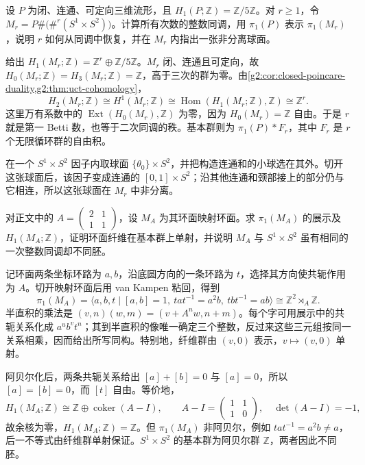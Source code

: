 \begin{exercise}\label{g2:ex:three-connected-sum-homology}
	设 \(P\) 为闭、连通、可定向三维流形，且 \(H_1(P;\mathbb Z)=\mathbb Z/5\mathbb Z\)。对 \(r\ge1\)，令 \(M_r=P\#\bigl(\#^r(S^1\times S^2)\bigr)\)。计算所有次数的整数同调，用 \(\pi_1(P)\) 表示 \(\pi_1(M_r)\)，说明 \(r\) 如何从同调中恢复，并在 \(M_r\) 内指出一张非分离球面。
\end{exercise}
\begin{solution}
	给出 \(H_1(M_r;\mathbb Z)=\mathbb Z^r\oplus\mathbb Z/5\mathbb Z\)。\(M_r\) 闭、连通且可定向，故 \(H_0(M_r;\mathbb Z)=H_3(M_r;\mathbb Z)=\mathbb Z\)，高于三次的群为零。由\cref{g2:cor:closed-poincare-duality,g2:thm:uct-cohomology}，
	\[
		H_2(M_r;\mathbb Z)\cong H^1(M_r;\mathbb Z)
		\cong\operatorname{Hom}(H_1(M_r;\mathbb Z),\mathbb Z)
		\cong\mathbb Z^r.
	\]
	这里万有系数中的 \(\operatorname{Ext}(H_0(M_r),\mathbb Z)\) 为零，因为 \(H_0(M_r)=\mathbb Z\) 自由。于是 \(r\) 就是第一 Betti 数，也等于二次同调的秩。基本群则为 \(\pi_1(P)*F_r\)，其中 \(F_r\) 是 \(r\) 个无限循环群的自由积。

	在一个 \(S^1\times S^2\) 因子内取球面 \(\{\theta_0\}\times S^2\)，并把构造连通和的小球选在其外。切开这张球面后，该因子变成连通的 \([0,1]\times S^2\)；沿其他连通和颈部接上的部分仍与它相连，所以这张球面在 \(M_r\) 中非分离。
\end{solution}

\begin{exercise}\label{g2:ex:sol-torus-bundle-group}
	对正文中的 \(A=\begin{pmatrix}2&1\\1&1\end{pmatrix}\)，设 \(M_A\) 为其环面映射环面。求 \(\pi_1(M_A)\) 的展示及 \(H_1(M_A;\mathbb Z)\)，证明环面纤维在基本群上单射，并说明 \(M_A\) 与 \(S^1\times S^2\) 虽有相同的一次整数同调却不同胚。
\end{exercise}
\begin{solution}
	记环面两条坐标环路为 \(a,b\)，沿底圆方向的一条环路为 \(t\)，选择其方向使共轭作用为 \(A\)。切开映射环面后用 van Kampen 粘回，得到
	\[
		\pi_1(M_A)=\langle a,b,t\mid [a,b]=1,\ tat^{-1}=a^2b,\ tbt^{-1}=ab\rangle
		\cong\mathbb Z^2\rtimes_A\mathbb Z.
	\]
	半直积的乘法是 \((v,n)(w,m)=(v+A^nw,n+m)\)。每个字可用展示中的共轭关系化成 \(a^ub^vt^n\)；其到半直积的像唯一确定三个整数，反过来这些三元组按同一关系相乘，因而给出所写同构。特别地，纤维群由 \((v,0)\) 表示，\(v\mapsto(v,0)\) 单射。

	阿贝尔化后，两条共轭关系给出 \([a]+[b]=0\) 与 \([a]=0\)，所以 \([a]=[b]=0\)，而 \([t]\) 自由。等价地，
	\[
		H_1(M_A;\mathbb Z)\cong\mathbb Z\oplus\operatorname{coker}(A-I),\qquad
		A-I=\begin{pmatrix}1&1\\1&0\end{pmatrix},\quad\det(A-I)=-1,
	\]
	故余核为零，\(H_1(M_A;\mathbb Z)=\mathbb Z\)。但 \(\pi_1(M_A)\) 非阿贝尔，例如 \(tat^{-1}=a^2b\ne a\)，后一不等式由纤维群单射保证。\(S^1\times S^2\) 的基本群为阿贝尔群 \(\mathbb Z\)，两者因此不同胚。
\end{solution}

